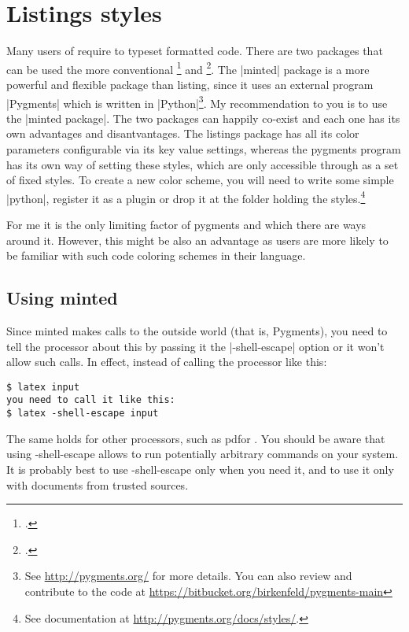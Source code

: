\documentclass[oneside]{ltxdoc}
\begin{document}

\chapter{Listings styles}  

Many users of \latex require to typeset formatted code. There are two packages that
can be used the more conventional \footcite{listings} and \footcite{minted}. The
|minted| package is a more powerful and flexible package than listing, since it uses
an external program |Pygments| which is written in |Python|\footnote{See \protect\url{http://pygments.org/} for more details. You can also review and contribute to the code at \protect\url{https://bitbucket.org/birkenfeld/pygments-main}}. My recommendation to you is
to use the |minted package|. The two packages can happily co-exist and each one has
its own advantages and disantvantages. The listings package has all its color
parameters configurable via its \latex key value settings, whereas the pygments program
has its own way of setting these styles, which are only accessible through \latex
as a set of fixed styles. To create a new color scheme, you will need to write some
simple |python|, register it as a plugin or drop it at the folder holding the styles.\footnote{See documentation at \protect\url{http://pygments.org/docs/styles/}.}

For me
it is the only limiting factor of pygments and which there are ways around it. However, this might be also an advantage
as users are more likely to be familiar with such code coloring schemes in their language.

\section{Using minted}

Since minted makes calls to the outside world (that is, Pygments), you need to
tell the \latex processor about this by passing it the |-shell-escape| option or it
won’t allow such calls. In effect, instead of calling the processor like this:

\begin{verbatim}
$ latex input
you need to call it like this:
$ latex -shell-escape input
\end{verbatim}

The same holds for other processors, such as pdf\latex or \xelatex.
You should be aware that using -shell-escape allows \latex to run potentially
arbitrary commands on your system. It is probably best to use -shell-escape
only when you need it, and to use it only with documents from trusted sources.
\end{document}
